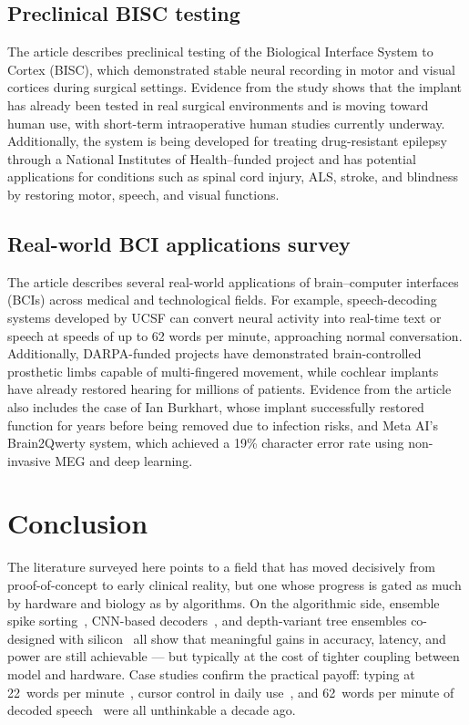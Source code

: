 \documentclass[11pt]{article}
\begin{document}
\subsection*{Preclinical BISC testing \cite{hoos2025columbia}}
The article describes preclinical testing of the Biological Interface System to
Cortex (BISC), which demonstrated stable neural recording in motor and visual
cortices during surgical settings. Evidence from the study shows that the
implant has already been tested in real surgical environments and is moving
toward human use, with short-term intraoperative human studies currently
underway. Additionally, the system is being developed for treating
drug-resistant epilepsy through a National Institutes of Health--funded project
and has potential applications for conditions such as spinal cord injury, ALS,
stroke, and blindness by restoring motor, speech, and visual functions.

\subsection*{Real-world BCI applications survey \cite{kreg2025byfounders}}
The article describes several real-world applications of brain--computer
interfaces (BCIs) across medical and technological fields. For example,
speech-decoding systems developed by UCSF can convert neural activity into
real-time text or speech at speeds of up to 62 words per minute, approaching
normal conversation. Additionally, DARPA-funded projects have demonstrated
brain-controlled prosthetic limbs capable of multi-fingered movement, while
cochlear implants have already restored hearing for millions of patients.
Evidence from the article also includes the case of Ian Burkhart, whose implant
successfully restored function for years before being removed due to infection
risks, and Meta AI's Brain2Qwerty system, which achieved a 19\% character error
rate using non-invasive MEG and deep learning.

\section{Conclusion}

The literature surveyed here points to a field that has moved decisively
from proof-of-concept to early clinical reality, but one whose progress
is gated as much by hardware and biology as by algorithms. On the
algorithmic side, ensemble spike sorting~\cite{llobet2022lussac},
CNN-based decoders~\cite{shevchenko2024decoding}, and depth-variant tree
ensembles co-designed with silicon~\cite{zhu2021closedloop} all show
that meaningful gains in accuracy, latency, and power are still
achievable --- but typically at the cost of tighter coupling between
model and hardware. Case studies confirm the practical payoff: typing
at 22~words per minute~\cite{case_keyboard2026}, cursor control in
daily use~\cite{neuralink2024prime}, and 62~words per minute of decoded
speech~\cite{willett2023speech} were all unthinkable a decade ago.
\end{document}
